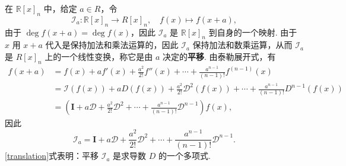 \documentclass[12pt, a4paper,newtx]{ctexart}
\begin{document}
在 $\mathbb R[x]_n$ 中，给定 $a \in R$，令
\[
\mathcal{I}_a : \mathbb R[x]_n \longrightarrow R[x]_n,\quad f(x) \longmapsto f(x+a),
\]
由于 $\deg f(x+a) = \deg f(x)$，因此 $\mathcal{I}_a$ 是 $\mathbb R[x]_n$ 到自身的一个映射. 由于 $x$ 用 $x+a$ 代入是保持加法和乘法运算的，因此 $\mathcal{I}_a$ 保持加法和数乘运算，从而 $\mathcal{I}_a$ 是 $R[x]_n$ 上的一个线性变换，称它是由 $a$ 决定的\textbf{平移}. 由泰勒展开式，有
\begin{align*}
	f(x+a) &= f(x) + af'(x) + \frac{a^2}{2!} f''(x) + \cdots + \frac{a^{n-1}}{(n-1)!} f^{(n-1)}(x)\\&= \mathcal{I}(f(x)) + aD(f(x)) + \frac{a^2}{2!}\mathcal D^2(f(x)) + \cdots + \frac{a^{n-1}}{(n-1)!} D^{n-1}(f(x))\\&= (\bm I + a\mathcal D + \frac{a^2}{2!} \mathcal D^2 + \cdots + \frac{a^{n-1}}{(n-1)!}\mathcal D^{n-1}) f(x),
\end{align*}
因此\begin{equation}\label{translation}
	\mathcal{I}_a = \bm I + a\mathcal D + \frac{a^2}{2!}\mathcal D^2 + \cdots + \frac{a^{n-1}}{(n-1)!} \mathcal D^{n-1}.
\end{equation}
\eqref{translation}式表明：平移 $\mathcal{I}_a$ 是求导数 $D$ 的一个多项式. 
\end{document}
